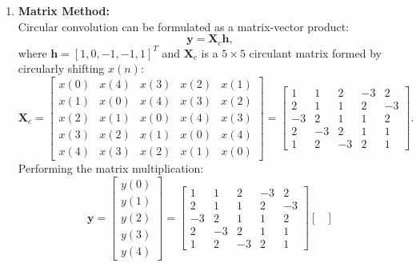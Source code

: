 \documentclass[12pt,a4paper]{article}
\begin{document}
\begin{enumerate}
    \item \textbf{Matrix Method:}\\[0.5ex]
    Circular convolution can be formulated as a matrix-vector product:
    \begin{equation}
        \mathbf{y} = \mathbf{X}_c \mathbf{h},
        \label{eq:circ_matrix_mult}
    \end{equation}
    where $\mathbf{h} = [1, 0, -1, -1, 1]^T$ and $\mathbf{X}_c$ is a $5 \times 5$ circulant matrix formed by circularly shifting $x(n)$:
    \begin{equation}
        \mathbf{X}_c = \begin{bmatrix}
            x(0) & x(4) & x(3) & x(2) & x(1) \\
            x(1) & x(0) & x(4) & x(3) & x(2) \\
            x(2) & x(1) & x(0) & x(4) & x(3) \\
            x(3) & x(2) & x(1) & x(0) & x(4) \\
            x(4) & x(3) & x(2) & x(1) & x(0)
        \end{bmatrix} = \begin{bmatrix}
            1 & 1 & 2 & -3 & 2 \\
            2 & 1 & 1 & 2 & -3 \\
            -3 & 2 & 1 & 1 & 2 \\
            2 & -3 & 2 & 1 & 1 \\
            1 & 2 & -3 & 2 & 1
        \end{bmatrix}.
    \end{equation}
    Performing the matrix multiplication:
    \begin{equation}
        \mathbf{y} = \begin{bmatrix}
            y(0) \\ y(1) \\ y(2) \\ y(3) \\ y(4)
        \end{bmatrix} =
        \begin{bmatrix}
            1 & 1 & 2 & -3 & 2 \\
            2 & 1 & 1 & 2 & -3 \\
            -3 & 2 & 1 & 1 & 2 \\
            2 & -3 & 2 & 1 & 1 \\
            1 & 2 & -3 & 2 & 1
        \end{bmatrix}
        \begin{bmatrix}

\end{bmatrix}
\end{equation}
\end{enumerate}
\end{document}
